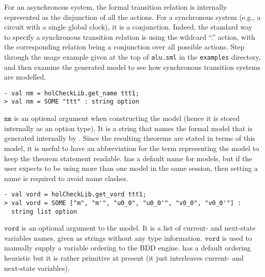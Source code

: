 For an asynchronous system, the formal transition relation is internally represented as the disjunction of all the actions. For a synchronous system (e.g., a circuit with a single global clock), it is a conjunction. Indeed, the standard way to specify a synchronous transition relation is using the wildcard ``.'' action, with the corresponding relation being a conjunction over all possible actions. Step through the usage example given at the top of \texttt{alu.sml} in the \hc{} \texttt{examples} directory, and then examine the generated model to see how synchronous transition systems are modelled.

\begin{session}\begin{verbatim}
- val nm = holCheckLib.get_name ttt1;
> val nm = SOME "ttt" : string option
\end{verbatim}\end{session}
\(\mathtt{nm}\) is an optional argument when constructing the model (hence it is stored internally as an option type). It is a string that names the formal model that is generated internally by \hc{}. Since the resulting theorems are stated in terms of this model, it is useful to have an abbreviation for the term representing the model to keep the theorem statement readable. \hc{} has a default name for models, but if the user expects to be using more than one model in the same session, then setting a name is required to avoid name clashes.

\begin{session}\begin{verbatim}
- val vord = holCheckLib.get_vord ttt1;
> val vord = SOME ["m", "m'", "u0_0", "u0_0'", "v0_0", "v0_0'"] :
  string list option
\end{verbatim}\end{session}
\(\mathtt{vord}\) is an optional argument to the model. It is a list of current- and next-state variables names, given as strings without any type information. \(\mathtt{vord}\) is used to manually supply a variable ordering to the BDD engine. \hc{} has a default ordering heuristic but it is rather primitive at present (it just interleaves current- and next-state variables).

